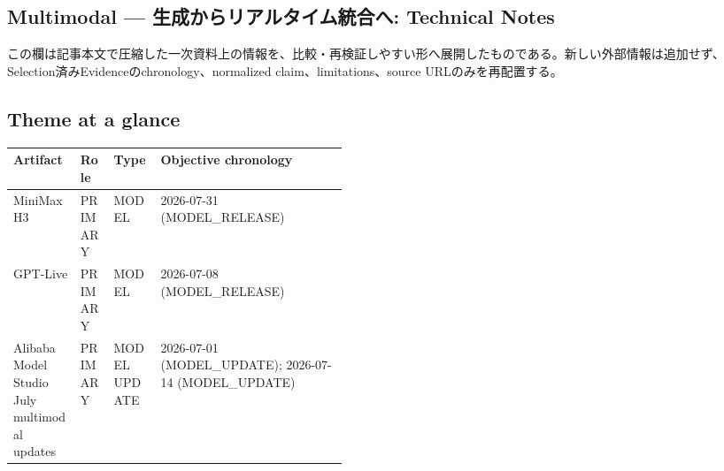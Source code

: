 \clearpage
{}
\subsection*{Multimodal — 生成からリアルタイム統合へ: Technical Notes}
この欄は記事本文で圧縮した一次資料上の情報を、比較・再検証しやすい形へ展開したものである。新しい外部情報は追加せず、Selection済みEvidenceのchronology、normalized claim、limitations、source URLのみを再配置する。
\medskip
\subsection*{Theme at a glance}
\begin{center}
\footnotesize
\begin{tabularx}{\linewidth}{@{}p{0.20\linewidth}p{0.10\linewidth}p{0.14\linewidth}X@{}}
\toprule
Artifact & Role & Type & Objective chronology \\
\midrule
MiniMax H3 & PRIMARY & MODEL & 2026-07-31 (MODEL\_RELEASE) \\
GPT-Live & PRIMARY & MODEL & 2026-07-08 (MODEL\_RELEASE) \\
Alibaba Model Studio July multimodal updates & PRIMARY & MODEL UPDATE & 2026-07-01 (MODEL\_UPDATE); 2026-07-14 (MODEL\_UPDATE) \\
\bottomrule
\end{tabularx}
\end{center}
\normalsize

